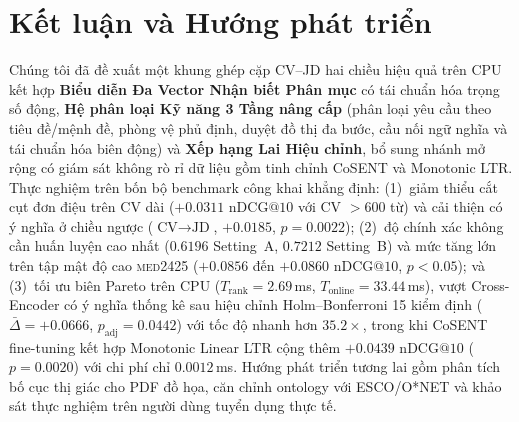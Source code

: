 \section{Kết luận và Hướng phát triển}

Chúng tôi đã đề xuất một khung ghép cặp CV--JD hai chiều hiệu quả trên CPU kết hợp \textbf{Biểu diễn Đa Vector Nhận biết Phân mục} có tái chuẩn hóa trọng số động, \textbf{Hệ phân loại Kỹ năng 3 Tầng nâng cấp} (phân loại yêu cầu theo tiêu đề/mệnh đề, phòng vệ phủ định, duyệt đồ thị đa bước, cầu nối ngữ nghĩa và tái chuẩn hóa biên động) và \textbf{Xếp hạng Lai Hiệu chỉnh}, bổ sung nhánh mở rộng có giám sát không rò rỉ dữ liệu gồm tinh chỉnh CoSENT và Monotonic LTR. Thực nghiệm trên bốn bộ benchmark công khai khẳng định: (1)~giảm thiểu cắt cụt đơn điệu trên CV dài ($+0.0311$ $\text{nDCG}@10$ với CV $>600$ từ) và cải thiện có ý nghĩa ở chiều ngược ($\text{CV}\rightarrow\text{JD}$, $+0.0185$, $p=0.0022$); (2)~độ chính xác không cần huấn luyện cao nhất ($0.6196$ Setting~A, $0.7212$ Setting~B) và mức tăng lớn trên tập mật độ cao \textsc{med2425} ($+0.0856$ đến $+0.0860$ $\text{nDCG}@10$, $p<0.05$); và (3)~tối ưu biên Pareto trên CPU ($T_{\text{rank}}=2.69$\,ms, $T_{\text{online}}=33.44$\,ms), vượt Cross-Encoder có ý nghĩa thống kê sau hiệu chỉnh Holm--Bonferroni 15 kiểm định ($\bar{\Delta}=+0.0666$, $p_{\text{adj}}=0.0442$) với tốc độ nhanh hơn $35.2\times$, trong khi CoSENT fine-tuning kết hợp Monotonic Linear LTR cộng thêm $+0.0439$ $\text{nDCG}@10$ ($p=0.0020$) với chi phí chỉ $0.0012$\,ms. Hướng phát triển tương lai gồm phân tích bố cục thị giác cho PDF đồ họa, căn chỉnh ontology với ESCO/O*NET và khảo sát thực nghiệm trên người dùng tuyển dụng thực tế.

